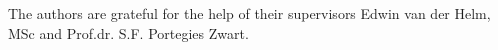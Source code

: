 \documentclass{aa}
\begin{document}
\begin{acknowledgements}
      The authors are grateful for the help of their supervisors
      Edwin van der Helm, MSc and Prof.dr. S.F. Portegies Zwart.
\end{acknowledgements}



 
 
\end{document}
